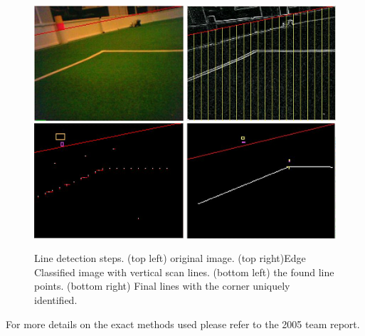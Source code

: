 \begin{figure}[!h]
\begin{center}
    \scalebox{0.8} {\includegraphics{RobinFig/linesfig.png} }
    \caption{Line detection steps. (top left) original image. (top right)Edge Classified image with vertical scan lines. (bottom left) the found line points. (bottom right) Final lines with the corner uniquely identified.}
    \label{fig:lines1}
\end{center}
\end{figure}

For more details on the exact methods used please refer to the 2005 team report.